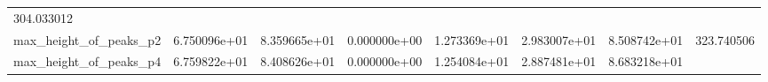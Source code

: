 \documentclass[11pt]{article}
\begin{document}
\begin{longtable}[]{@{}llllllll@{}}
\begin{minipage}[t]{0.08\columnwidth}
304.033012\strut
\end{minipage}\tabularnewline
\begin{minipage}[t]{0.16\columnwidth}\raggedright
max\_height\_of\_peaks\_p2\strut
\end{minipage} & \begin{minipage}[t]{0.09\columnwidth}\raggedright
6.750096e+01\strut
\end{minipage} & \begin{minipage}[t]{0.09\columnwidth}\raggedright
8.359665e+01\strut
\end{minipage} & \begin{minipage}[t]{0.09\columnwidth}\raggedright
0.000000e+00\strut
\end{minipage} & \begin{minipage}[t]{0.09\columnwidth}\raggedright
1.273369e+01\strut
\end{minipage} & \begin{minipage}[t]{0.09\columnwidth}\raggedright
2.983007e+01\strut
\end{minipage} & \begin{minipage}[t]{0.09\columnwidth}\raggedright
8.508742e+01\strut
\end{minipage} & \begin{minipage}[t]{0.08\columnwidth}\raggedright
323.740506\strut
\end{minipage}\tabularnewline
\begin{minipage}[t]{0.16\columnwidth}\raggedright
max\_height\_of\_peaks\_p4\strut
\end{minipage} & \begin{minipage}[t]{0.09\columnwidth}\raggedright
6.759822e+01\strut
\end{minipage} & \begin{minipage}[t]{0.09\columnwidth}\raggedright
8.408626e+01\strut
\end{minipage} & \begin{minipage}[t]{0.09\columnwidth}\raggedright
0.000000e+00\strut
\end{minipage} & \begin{minipage}[t]{0.09\columnwidth}\raggedright
1.254084e+01\strut
\end{minipage} & \begin{minipage}[t]{0.09\columnwidth}\raggedright
2.887481e+01\strut
\end{minipage} & \begin{minipage}[t]{0.09\columnwidth}\raggedright
8.683218e+01\strut
\end{minipage} & \begin{minipage}[t]{0.08\columnwidth}\raggedright

\end{minipage}
\end{longtable}
\end{document}
